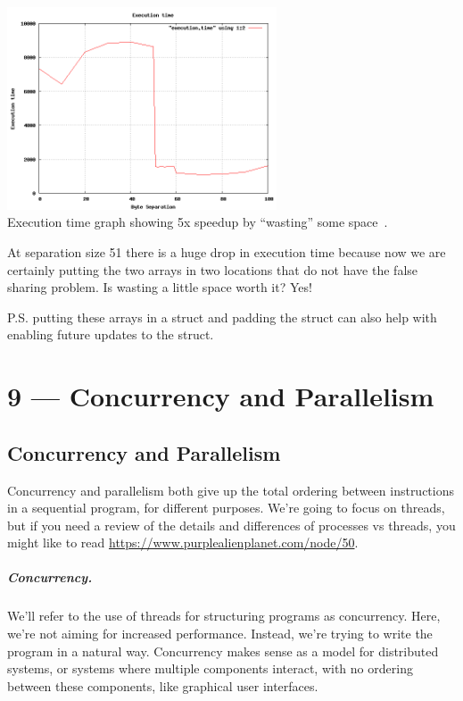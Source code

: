 \documentclass[a4paper]{report}
\begin{document}
\begin{center}
\includegraphics[width=0.6\textwidth]{images/falsesharing.png}\\
Execution time graph showing 5x speedup by ``wasting'' some space~\cite{falsesharing}.
\end{center}

At separation size 51 there is a huge drop in execution time because now we are certainly putting the two arrays in two locations that do not have the false sharing problem. Is wasting a little space worth it? Yes!

P.S. putting these arrays in a struct and padding the struct can also help with enabling future updates to the struct.









\chapter*{9 --- Concurrency and Parallelism}


\section*{Concurrency and Parallelism}
Concurrency and parallelism both give up the
total ordering between instructions in a sequential program, for
different purposes. We're going to focus on threads, but if you need a review of the details and differences of processes vs threads, you might like to read   \url{https://www.purplealienplanet.com/node/50}. 

\paragraph{Concurrency.} We'll refer to the use of threads for
structuring programs as concurrency. Here, we're not aiming
for increased performance. Instead, we're trying to write the program
in a natural way. Concurrency makes sense as a model for distributed
systems, or systems where multiple components interact, with no ordering
between these components, like graphical user interfaces.
\end{document}
